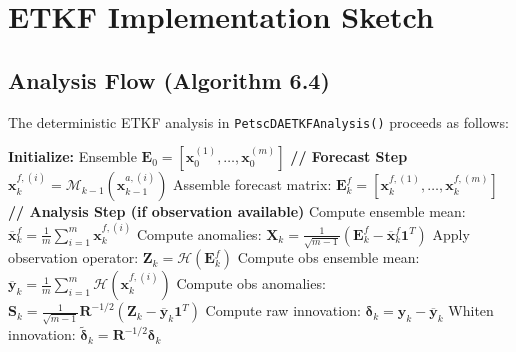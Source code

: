 \documentclass[11pt]{article}
\begin{document}
\section{ETKF Implementation Sketch}

\subsection{Analysis Flow (Algorithm 6.4)}

The deterministic ETKF analysis in \texttt{PetscDAETKFAnalysis()} proceeds as follows:


\begin{algorithm}
\caption{Ensemble Transform Kalman Filter (ETKF) - Deterministic}
\begin{algorithmic}[1]
\State \textbf{Initialize:} Ensemble $\mathbf{E}_0 = [\mathbf{x}_0^{(1)}, \ldots, \mathbf{x}_0^{(m)}]$ 
    \State \textbf{// Forecast Step}
        \State $\mathbf{x}_k^{f,(i)} = \mathcal{M}_{k-1}(\mathbf{x}_{k-1}^{a,(i)})$ 
    \EndFor
    \State Assemble forecast matrix: $\mathbf{E}_k^f = [\mathbf{x}_k^{f,(1)}, \ldots, \mathbf{x}_k^{f,(m)}]$ 
    \State
    \State \textbf{// Analysis Step (if observation available)}
        \State Compute ensemble mean: $\overline{\mathbf{x}}_k^f = \frac{1}{m}\sum_{i=1}^m \mathbf{x}_k^{f,(i)}$ 
        \State Compute anomalies: $\mathbf{X}_k = \frac{1}{\sqrt{m-1}}(\mathbf{E}_k^f - \overline{\mathbf{x}}_k^f \mathbf{1}^T)$ 
        \State Apply observation operator: $\mathbf{Z}_k = \mathcal{H}(\mathbf{E}_k^f)$ 
        \State Compute obs ensemble mean: $\overline{\mathbf{y}}_k = \frac{1}{m}\sum_{i=1}^m \mathcal{H}(\mathbf{x}_k^{f,(i)})$ 
        \State Compute obs anomalies: $\mathbf{S}_k = \frac{1}{\sqrt{m-1}}\mathbf{R}^{-1/2}(\mathbf{Z}_k - \overline{\mathbf{y}}_k\mathbf{1}^T)$ 
        \State Compute raw innovation: $\boldsymbol{\delta}_k = \mathbf{y}_k - \overline{\mathbf{y}}_k$ 
        \State Whiten innovation: $\tilde{\boldsymbol{\delta}}_k = \mathbf{R}^{-1/2}\boldsymbol{\delta}_k$ 

\end{algorithmic}
\end{algorithm}
\end{document}

